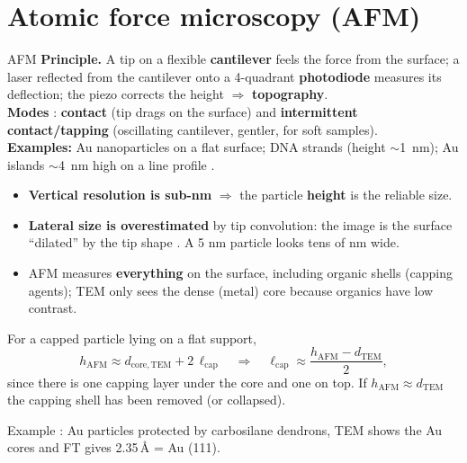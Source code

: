 \section{Atomic force microscopy (AFM)}
\begin{cardbox}{AFM }
\textbf{Principle.} A tip on a flexible \textbf{cantilever} feels the force from the surface; a laser reflected from the
cantilever onto a 4-quadrant \textbf{photodiode} measures its deflection; the piezo corrects the height
$\Rightarrow$ \textbf{topography}.\\
\textbf{Modes} : \textbf{contact} (tip drags on the surface) and \textbf{intermittent contact/tapping}
(oscillating cantilever, gentler, for soft samples).\\
\textbf{Examples:} Au nanoparticles on a flat surface; DNA strands (height $\sim$\SI{1}{nm}); Au islands $\sim$\SI{4}{nm}
high on a line profile .
\end{cardbox}
\begin{keybox}
\begin{itemize}
  \item \textbf{Vertical resolution is sub-nm} $\Rightarrow$ the particle \textbf{height} is the reliable size.
  \item \textbf{Lateral size is overestimated} by tip convolution: the image is the surface ``dilated'' by the tip shape
        . A 5 nm particle looks tens of nm wide.
  \item AFM measures \textbf{everything} on the surface, including organic shells (capping agents); TEM only sees
        the dense (metal) core because organics have low contrast.
\end{itemize}
\end{keybox}
\begin{tipbox}
For a capped particle lying on a flat support,
\[
h_\mathrm{AFM} \approx d_\mathrm{core,TEM} + 2\,\ell_\mathrm{cap}
\quad\Rightarrow\quad
\ell_\mathrm{cap} \approx \frac{h_\mathrm{AFM}-d_\mathrm{TEM}}{2},
\]
since there is one capping layer under the core and one on top\extra. If $h_\mathrm{AFM}\approx d_\mathrm{TEM}$ the capping
shell has been removed (or collapsed).
\end{tipbox}
Example : Au particles protected by carbosilane dendrons, TEM shows the Au cores and FT gives
2.35\,\AA{} = Au (111).


